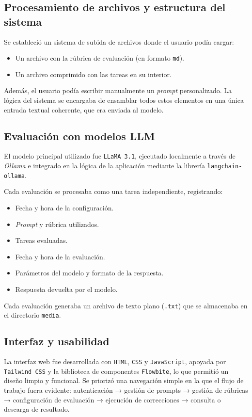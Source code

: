 \subsection*{Procesamiento de archivos y estructura del sistema}

Se estableció un sistema de subida de archivos donde el usuario podía cargar:
\begin{itemize}
    \item Un archivo con la rúbrica de evaluación (en formato \texttt{md}).
    \item Un archivo comprimido con las tareas en su interior.
\end{itemize}

Además, el usuario podía escribir manualmente un \textit{prompt} personalizado. La lógica del sistema se encargaba de ensamblar todos estos elementos en una única entrada textual coherente, que era enviada al modelo.

\subsection*{Evaluación con modelos LLM}

El modelo principal utilizado fue \texttt{LLaMA 3.1}, ejecutado localmente a través de \textit{Ollama} e integrado en la lógica de la aplicación mediante la librería \texttt{langchain-ollama}.

Cada evaluación se procesaba como una tarea independiente, registrando:
\begin{itemize}
    \item Fecha y hora de la configuración.
    \item \textit{Prompt} y rúbrica utilizados.
    \item Tareas evaluadas.
    \item Fecha y hora de la evaluación.
    \item Parámetros del modelo y formato de la respuesta.
    \item Respuesta devuelta por el modelo.
\end{itemize}

Cada evaluación generaba un archivo de texto plano (\texttt{.txt}) que se almacenaba en el directorio \texttt{media}.

\subsection*{Interfaz y usabilidad}

La interfaz web fue desarrollada con \texttt{HTML}, \texttt{CSS} y \texttt{JavaScript}, apoyada por \texttt{Tailwind CSS} y la biblioteca de componentes \texttt{Flowbite}, lo que permitió un diseño limpio y funcional. Se priorizó una navegación simple en la que el flujo de trabajo fuera evidente: autenticación → gestión de prompts  → gestión de rúbricas → configuración de evaluación → ejecución de correcciones → consulta o descarga de resultado.


